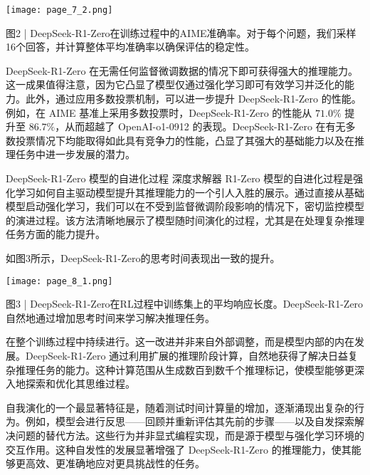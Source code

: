 \documentclass[12pt,a4paper]{report} %
\begin{document}
\begin{center}
\texttt{[image: page\_7\_2.png]}
\end{center}
\begin{center}


图2 | DeepSeek-R1-Zero在训练过程中的AIME准确率。对于每个问题，我们采样16个回答，并计算整体平均准确率以确保评估的稳定性。


\end{center}




DeepSeek-R1-Zero 在无需任何监督微调数据的情况下即可获得强大的推理能力。这一成果值得注意，因为它凸显了模型仅通过强化学习即可有效学习并泛化的能力。此外，通过应用多数投票机制，可以进一步提升 DeepSeek-R1-Zero 的性能。例如，在 AIME 基准上采用多数投票时，DeepSeek-R1-Zero 的性能从 $71.0 \%$ 提升至 $86.7 \%$，从而超越了 OpenAI-o1-0912 的表现。DeepSeek-R1-Zero 在有无多数投票情况下均能取得如此具有竞争力的性能，凸显了其强大的基础能力以及在推理任务中进一步发展的潜力。


DeepSeek-R1-Zero 模型的自进化过程 深度求解器 R1-Zero 模型的自进化过程是强化学习如何自主驱动模型提升其推理能力的一个引人入胜的展示。通过直接从基础模型启动强化学习，我们可以在不受到监督微调阶段影响的情况下，密切监控模型的演进过程。该方法清晰地展示了模型随时间演化的过程，尤其是在处理复杂推理任务方面的能力提升。


如图3所示，DeepSeek-R1-Zero的思考时间表现出一致的提升。
\begin{center}
\texttt{[image: page\_8\_1.png]}
\end{center}
\begin{center}


图3 | DeepSeek-R1-Zero在RL过程中训练集上的平均响应长度。DeepSeek-R1-Zero自然地通过增加思考时间来学习解决推理任务。


\end{center}




在整个训练过程中持续进行。这一改进并非来自外部调整，而是模型内部的内在发展。DeepSeek-R1-Zero 通过利用扩展的推理阶段计算，自然地获得了解决日益复杂推理任务的能力。这种计算范围从生成数百到数千个推理标记，使模型能够更深入地探索和优化其思维过程。


自我演化的一个最显著特征是，随着测试时间计算量的增加，逐渐涌现出复杂的行为。例如，模型会进行反思——回顾并重新评估其先前的步骤——以及自发探索解决问题的替代方法。这些行为并非显式编程实现，而是源于模型与强化学习环境的交互作用。这种自发性的发展显著增强了 DeepSeek-R1-Zero 的推理能力，使其能够更高效、更准确地应对更具挑战性的任务。
\end{document}
